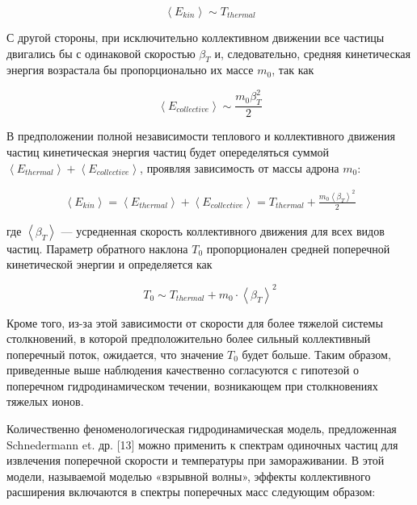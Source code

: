 \begin{equation}
	\left< E_{kin} \right>  \sim T_{thermal} 
\end{equation}

С другой стороны, при исключительно коллективном движении все частицы двигались бы с одинаковой скоростью $\beta_T$ и, следовательно, средняя кинетическая энергия возрастала бы пропорционально их массе $m_0$, так как

\begin{equation}
	\left< E_{collective} \right>  \sim \frac{m_0\beta_T^2}{2}
\end{equation}

В предположении полной независимости теплового и коллективного движения частиц кинетическая энергия частиц будет опеределяться суммой $\left< E_{thermal} \right> + \left< E_{collective} \right>$, проявляя зависимость от массы адрона $m_0$:

\begin{equation}
	\begin{split}
		\left< E_{kin} \right> = \left< E_{thermal} \right> + \left< E_{collective} \right> = T_{thermal} + \frac{m_0 \left< \beta_T \right>^2}{2} 
	\end{split}
\end{equation}

где $\left< \beta_T \right>$ — усредненная скорость коллективного движения для всех видов частиц. Параметр обратного наклона $T_0$ пропорционален средней поперечной кинетической энергии и определяется как

\begin{equation}
	T_0 \sim T_{thermal} + m_0 \cdot \left< \beta_T \right>^2
\end{equation}


Кроме того, из-за этой зависимости от скорости для более тяжелой системы столкновений, в которой предположительно более сильный коллективный поперечный поток, ожидается, что значение $T_0$ будет больше. Таким образом, приведенные выше наблюдения качественно согласуются с гипотезой о поперечном гидродинамическом течении, возникающем при столкновениях тяжелых ионов.

Количественно феноменологическая гидродинамическая модель, предложенная Schnedermann et. др. [13] можно применить к спектрам одиночных частиц для извлечения поперечной скорости и температуры при замораживании. В этой модели, называемой моделью «взрывной волны», эффекты коллективного расширения включаются в спектры поперечных масс следующим образом:

